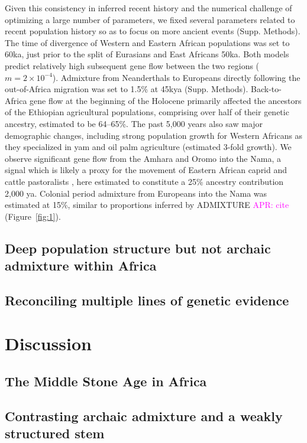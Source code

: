 \documentclass[]{article}
\newcommand{\aprcomment}[1]{{\textcolor{magenta}{APR: #1}}}
\begin{document}
Given this consistency in inferred recent history and the numerical challenge
of optimizing a large number of parameters, we fixed several parameters related
to recent population history so as to focus on more ancient events (Supp.
Methods). The time of divergence of Western and Eastern African populations was
set to 60ka, just prior to the split of Eurasians and East Africans 50ka. Both
models predict relatively high subsequent gene flow between the two regions
($m=2\times10^{-4}$). Admixture from Neanderthals to Europeans directly
following the out-of-Africa migration was set to 1.5\% at 45kya (Supp.
Methods). Back-to-Africa gene flow at the beginning of the Holocene primarily
affected the ancestors of the Ethiopian agricultural populations, comprising
over half of their genetic ancestry, estimated to be 64--65\%. The past 5,000
years also saw major demographic changes, including strong population growth
for Western Africans as they specialized in yam and oil palm agriculture
(estimated 3-fold growth). We observe significant gene flow from the Amhara and
Oromo into the Nama, a signal which is likely a proxy for the movement of
Eastern African caprid and cattle pastoralists
\citep{Henn2008-xo,Breton2014-xb}, here estimated to constitute a 25\% ancestry
contribution 2,000 ya. Colonial period admixture from Europeans into the Nama
was estimated at 15\%, similar to proportions inferred by ADMIXTURE
\aprcomment{cite} (Figure~\ref{fig:1}).

\subsection*{Deep population structure but not archaic admixture within Africa}

\subsection*{Reconciling multiple lines of genetic evidence}

\section*{Discussion}

\subsection*{The Middle Stone Age in Africa}

\subsection*{Contrasting archaic admixture and a weakly structured stem}
\end{document}
